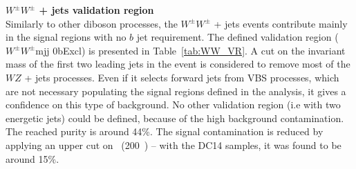 \begin{table}[htb!]
\caption{$WZ$ + jets validation region definition ($WZ$1j 0bExcl).}
\label{tab:WZ_VR}
\begin{center}
\end{center} 
\end{table}

\par{\bf $W^\pm W^\pm$ + jets validation region\\}
Similarly to other diboson processes, the $W^{\pm}W^{\pm}$ + jets events contribute mainly in the signal regions with no $b$ jet requirement. The defined validation region ($W^\pm W^{\pm}$mjj  0bExcl) is presented in Table~\ref{tab:WW_VR}. A cut on the invariant mass of the first two leading jets in the event is considered to remove most of the $WZ$ + jets processes. Even if it selects forward jets from VBS processes, which are not necessary populating the signal regions defined in the analysis, it gives a confidence on this type of background. No other validation region (i.e with two energetic jets) could be defined, because of the high background contamination. The reached purity is around 44\%.  The signal contamination is reduced by applying an upper cut on \met\ (200~\GeV) -- with the DC14 samples, it was found to be around 15$\%$.

\begin{table}[htb!]
\caption{$W^\pm W^\pm$ validation region definition ($W^\pm W^{\pm}$mjj  0bExcl).}
\label{tab:WW_VR}
\begin{center}
\end{center} 
\end{table}


